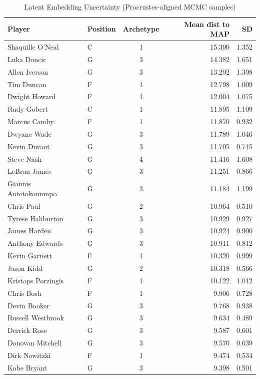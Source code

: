 \begin{table}[t]
\caption*{
{\fontsize{20}{25}\selectfont  Latent Embedding Uncertainty (Procrustes-aligned MCMC samples)\fontsize{12}{15}\selectfont }
} 
\fontsize{12.0pt}{14.0pt}\selectfont
\begin{tabular*}{\linewidth}{@{\extracolsep{\fill}}llcrr}
\toprule
Player & Position & Archetype & Mean dist to MAP & SD \\ 
\midrule\addlinespace[2.5pt]
Shaquille O'Neal & C & 1 & 15.390 & 1.352 \\ 
Luka Doncic & G & 3 & 14.382 & 1.651 \\ 
Allen Iverson & G & 3 & 13.292 & 1.398 \\ 
Tim Duncan & F & 1 & 12.798 & 1.009 \\ 
Dwight Howard & F & 1 & 12.004 & 1.075 \\ 
Rudy Gobert & C & 1 & 11.895 & 1.109 \\ 
Marcus Camby & F & 1 & 11.870 & 0.932 \\ 
Dwyane Wade & G & 3 & 11.789 & 1.046 \\ 
Kevin Durant & G & 3 & 11.705 & 0.745 \\ 
Steve Nash & G & 4 & 11.416 & 1.608 \\ 
LeBron James & G & 3 & 11.251 & 0.866 \\ 
Giannis Antetokounmpo & G & 3 & 11.184 & 1.199 \\ 
Chris Paul & G & 2 & 10.964 & 0.510 \\ 
Tyrese Haliburton & G & 3 & 10.929 & 0.927 \\ 
James Harden & G & 3 & 10.924 & 0.900 \\ 
Anthony Edwards & G & 3 & 10.911 & 0.812 \\ 
Kevin Garnett & F & 1 & 10.320 & 0.999 \\ 
Jason Kidd & G & 2 & 10.318 & 0.566 \\ 
Kristaps Porzingis & F & 1 & 10.122 & 1.012 \\ 
Chris Bosh & F & 1 & 9.906 & 0.728 \\ 
Devin Booker & G & 3 & 9.768 & 0.938 \\ 
Russell Westbrook & G & 3 & 9.634 & 0.489 \\ 
Derrick Rose & G & 3 & 9.587 & 0.601 \\ 
Donovan Mitchell & G & 3 & 9.570 & 0.639 \\ 
Dirk Nowitzki & F & 1 & 9.474 & 0.534 \\ 
Kobe Bryant & G & 3 & 9.398 & 0.501 \\ 

\end{tabular*}
\end{table}
